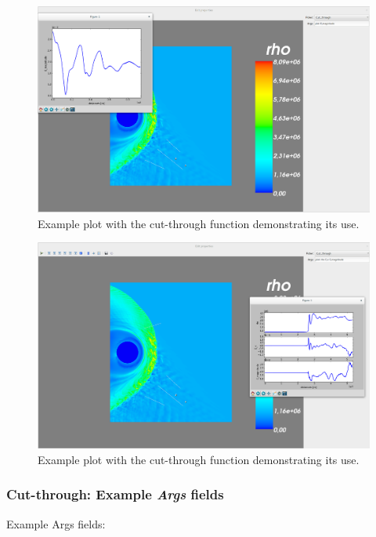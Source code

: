 \documentclass[a4paper,10pt]{article}
\begin{document}
\begin{figure}[H]
 \centering
 \includegraphics[width=\textwidth]{../../images/cut_through3.png}
 \caption{Example plot with the cut-through function demonstrating its use.}
 \label{fig:cut_through3}
\end{figure}

\begin{figure}[H]
 \centering
 \includegraphics[width=\textwidth]{../../images/cut_through4.png}
 \caption{Example plot with the cut-through function demonstrating its use.}
 \label{fig:cut_through4}
\end{figure}

\newpage

\subsubsection{Cut-through: Example \emph{Args} fields}

Example Args fields:
\end{document}
